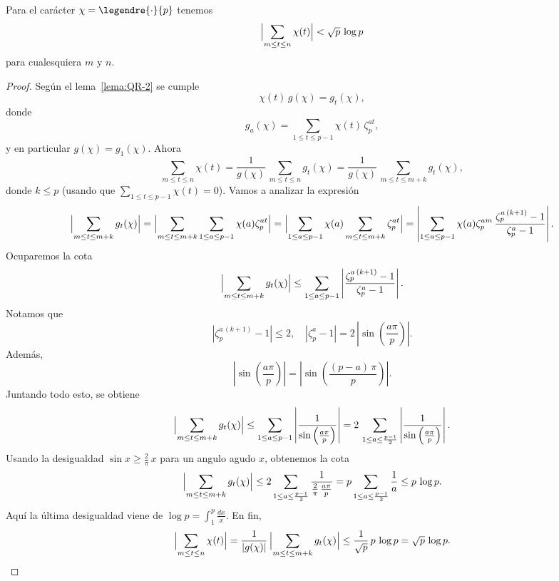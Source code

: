 \begin{proposicion}
  Para el carácter $\chi = \legendre{\cdot}{p}$ tenemos
  $$\Bigl|\sum_{m \le t \le n} \chi (t)\Bigr| < \sqrt{p}\,\log p$$
  para cualesquiera $m$ y $n$.

  \begin{proof}
    Según el lema~\ref{lema:QR-2} se cumple
    $$\chi (t) \, g (\chi) = g_t (\chi),$$
    donde
    $$g_a (\chi) = \sum_{1 \le t \le p-1} \chi(t)\,\zeta_p^{at},$$
    y en particular $g (\chi) = g_1 (\chi)$. Ahora
    \[ \sum_{m \le t \le n} \chi(t) =
       \frac{1}{g (\chi)}\,\sum_{m \le t \le n} g_t (\chi) =
       \frac{1}{g (\chi)}\,\sum_{m \le t \le m+k} g_t (\chi), \]
    donde $k \le p$ (usando que $\sum_{1 \le t \le p-1} \chi(t) = 0$).
    Vamos a analizar la expresión
    \[ \Bigl|\sum_{m \le t \le m+k} g_t (\chi)\Bigr| =
       \Bigl|\sum_{m \le t \le m+k} \sum_{1 \le a \le p-1} \chi(a) \zeta_p^{at}\Bigr| =
       \Bigl|\sum_{1 \le a \le p-1} \chi(a) \sum_{m \le t \le m+k} \zeta_p^{at}\Bigr| =
       \left|\sum_{1 \le a \le p-1} \chi(a) \zeta_p^{am}\,\frac{\zeta_p^{a\,(k+1)} - 1}{\zeta_p^a - 1}\right|. \]
    Ocuparemos la cota
    \[ \Bigl|\sum_{m \le t \le m+k} g_t (\chi)\Bigr| \le
       \sum_{1 \le a \le p-1} \left|\frac{\zeta_p^{a\,(k+1)} - 1}{\zeta_p^a - 1}\right|. \]
    Notamos que
    \[ |\zeta_p^{a\,(k+1)} - 1| \le 2, \quad
       |\zeta_p^a - 1| = 2\,\left|\sin \left(\frac{a\pi}{p}\right)\right|. \]
    Además,
    \[ \left|\sin \left(\frac{a\pi}{p}\right)\right| =
       \left|\sin \left(\frac{(p-a)\,\pi}{p}\right)\right|. \]
    Juntando todo esto, se obtiene
    \[ \Bigl|\sum_{m \le t \le m+k} g_t (\chi)\Bigr| \le
       \sum_{1 \le a \le p-1} \left|\frac{1}{\sin \left(\frac{a\pi}{p}\right)}\right| =
       2\,\sum_{1 \le a \le \frac{p-1}{2}} \left|\frac{1}{\sin \left(\frac{a\pi}{p}\right)}\right|. \]
    Usando la desigualdad $\sin x \ge \frac{2}{\pi}\,x$ para un angulo agudo
    $x$, obtenemos la cota
    \[ \Bigl|\sum_{m \le t \le m+k} g_t (\chi)\Bigr| \le
       2\sum_{1 \le a \le \frac{p-1}{2}} \frac{1}{\frac{2}{\pi}\,\frac{a \pi}{p}} =
       p\sum_{1 \le a \le \frac{p-1}{2}} \frac{1}{a} \le p\,\log p. \]
    Aquí la última desigualdad viene de $\log p = \int_1^p \frac{dx}{x}$.
    En fin,
    \[ \Bigl|\sum_{m \le t \le n} \chi (t)\Bigr| =
       \frac{1}{|g (\chi)|}\,\Bigl|\sum_{m \le t \le m+k} g_t (\chi)\Bigr| \le
       \frac{1}{\sqrt{p}}\,p\,\log p =
       \sqrt{p}\,\log p. \qedhere \]
  \end{proof}
\end{proposicion}

